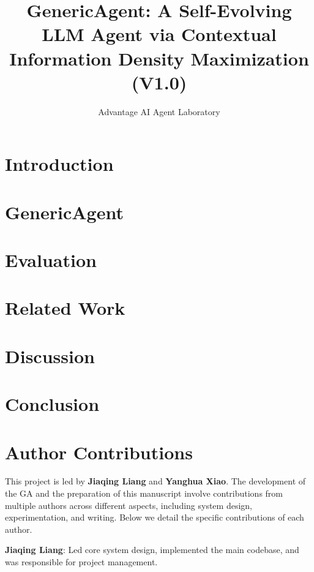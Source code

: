 \documentclass[]{kw_latex_template}
\title{GenericAgent: A Self-Evolving LLM Agent via Contextual Information Density Maximization (V1.0)
}
\author{
Advantage AI Agent Laboratory \\
}
\begin{document}
\maketitle

\section{Introduction}
\label{sec:intro}


\section{GenericAgent}
\label{sec:method}


\section{Evaluation}
\label{sec:eval}


\section{Related Work}
\label{sec:related}


\section{Discussion}
\label{sec:discussion}


\section{Conclusion}
\label{sec:conclusion}


\clearpage



\clearpage
\section{Author Contributions}
\label{sec:contributions}
This project is led by \textbf{Jiaqing Liang} and \textbf{Yanghua Xiao}. The development of the GA and the preparation of this manuscript involve contributions from multiple authors across different aspects, including system design, experimentation, and writing. 
Below we detail the specific contributions of each author.

\noindent\textbf{Jiaqing Liang}: Led core system design, implemented the main codebase, and was responsible for project management.
\end{document}
